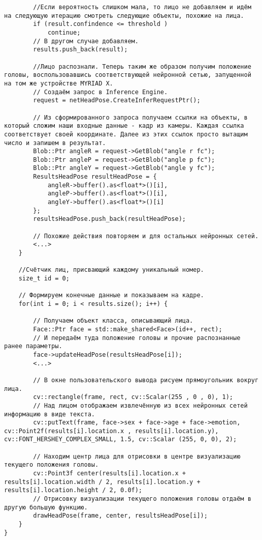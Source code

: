 \documentclass[14pt,a4paper]{scrartcl}
\begin{document}
\begin{verbatim}
		//Если вероятность слишком мала, то лицо не добавляем и идём на следующую итерацию смотреть следующие объекты, похожие на лица.
		if (result.confindence <= threshold ) 
			continue;
		// В другом случае добавляем.
		results.push_back(result);
		
		//Лицо распознали. Теперь таким же образом получим положение головы, воспользовавшись соответствующей нейронной сетью, запущенной на том же устройстве MYRIAD X.
		// Создаём запрос в Inference Engine.
		request = netHeadPose.CreateInferRequestPtr();
		
		// Из сформированного запроса получаем ссылки на объекты, в который сложим наши входные данные - кадр из камеры. Каждая ссылка соответствует своей координате. Далее из этих ссылок просто вытащим число и запишем в результат.
		Blob::Ptr angleR = request->GetBlob("angle r fc");
		Blob::Ptr angleP = request->GetBlob("angle p fc");
		Blob::Ptr angleY = request->GetBlob("angle y fc");
		ResultsHeadPose resultHeadPose = {
			angleR->buffer().as<float*>()[i],
			angleP->buffer().as<float*>()[i],
			angleY->buffer().as<float*>()[i]
		};
		resultsHeadPose.push_back(resultHeadPose);
		
		// Похожие действия повторяем и для остальных нейронных сетей.
		<...>
	}

	//Счётчик лиц, присвающий каждому уникальный номер.
	size_t id = 0;

	// Формируем конечные данные и показываем на кадре.
	for(int i = 0; i < results.size(); i++) {
	
		// Получаем объект класса, описывающий лица.
		Face::Ptr face = std::make_shared<Face>(id++, rect);
		// И передаём туда положение головы и прочие распознанные ранее параметры.
		face->updateHeadPose(resultsHeadPose[i]);
		<...>

		// В окне пользовательского вывода рисуем прямоугольник вокруг лица.
		cv::rectangle(frame, rect, cv::Scalar(255 , 0 , 0), 1);
		// Над лицом отображаем извлечённую из всех нейронных сетей информацию в виде текста.
		cv::putText(frame, face->sex + face->age + face->emotion, cv::Point2f(results[i].location.x , results[i].location.y), cv::FONT_HERSHEY_COMPLEX_SMALL, 1.5, cv::Scalar (255, 0, 0), 2);
		
		// Находим центр лица для отрисовки в центре визуализацию текущего положения головы.
		cv::Point3f center(results[i].location.x + results[i].location.width / 2, results[i].location.y + results[i].location.height / 2, 0.0f);
		// Отрисовку визуализации текущего положения головы отдаём в другую большую функцию.
		drawHeadPose(frame, center, resultsHeadPose[i]);
	}
}
			\end{verbatim}
			
\end{document}
